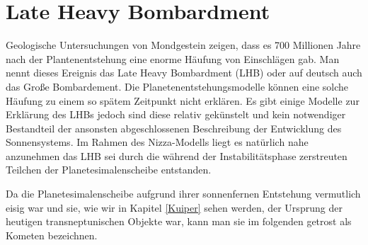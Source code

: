 \documentclass[12pt,a4paper,twoside]{article}
\renewcommand{\cite}{\citep}
\begin{document}
\FloatBarrier
\section{Late Heavy Bombardment}\label{LHB}
Geologische Untersuchungen von Mondgestein zeigen, dass es 700 Millionen Jahre nach der Plantenentstehung
eine enorme Häufung von Einschlägen gab. Man nennt dieses Ereignis das Late Heavy Bombardment (LHB) oder auf deutsch auch das Große Bombardement\cite{Tera1974}.
Die Planetenentstehungsmodelle können eine solche Häufung zu einem so spätem Zeitpunkt nicht erklären.
Es gibt einige Modelle zur Erklärung des LHBs jedoch sind diese relativ gekünstelt und kein notwendiger Bestandteil der ansonsten abgeschlossenen Beschreibung der Entwicklung des Sonnensystems\cite{Gomes2005}. %
Im Rahmen des Nizza-Modells liegt es natürlich nahe anzunehmen das LHB sei durch die während der Instabilitätsphase zerstreuten Teilchen der Planetesimalenscheibe entstanden. %

Da die Planetesimalenscheibe aufgrund ihrer sonnenfernen Entstehung vermutlich eisig war und sie, wie wir in Kapitel \ref{Kuiper} sehen werden, der Ursprung der heutigen transneptunischen Objekte war, kann man sie im folgenden getrost als Kometen bezeichnen\cite{Gomes2005}. %
\end{document}
